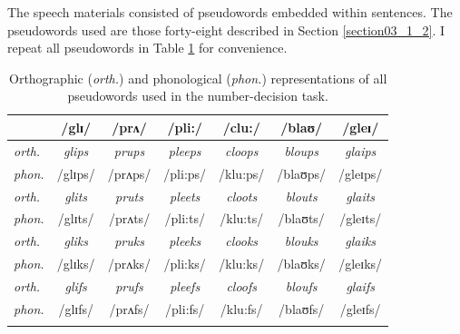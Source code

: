 The speech materials consisted of pseudowords embedded within sentences. The pseudowords used are those forty-eight described in Section \ref{section03_1_2}. I repeat all pseudowords in Table \ref{tab:8.1} for convenience.

\begin{table}\fontsize{10}{11}
\caption{Orthographic (\textit{orth.}) and phonological (\textit{phon.}) representations of all pseudowords used in the number-decision task.}
\label{tab:8.1}
\centering
\begin{tabular}{lcccccc} 
\lsptoprule
~              & /glɪ/          & /prʌ/          & /pli:/          & /clu:/          & /blaʊ/          & /gleɪ/           \\ 
\midrule
\textit{orth.} & \textit{glips} & \textit{prups} & \textit{pleeps} & \textit{cloops} & \textit{bloups} & \textit{glaips}  \\
\textit{phon.} & /glɪps/        & /prʌps/        & /pli:ps/        & /klu:ps/        & /blaʊps/        & /gleɪps/         \\ 
\midrule
\textit{orth.} & \textit{glits} & \textit{pruts} & \textit{pleets} & \textit{cloots} & \textit{blouts} & \textit{glaits}  \\
\textit{phon.} & /glɪts/        & /prʌts/        & /pli:ts/        & /klu:ts/        & /blaʊts/        & /gleɪts/         \\ 
\midrule
\textit{orth.} & \textit{gliks} & \textit{pruks} & \textit{pleeks} & \textit{clooks} & \textit{blouks} & \textit{glaiks}  \\
\textit{phon.} & /glɪks/        & /prʌks/        & /pli:ks/        & /klu:ks/        & /blaʊks/        & /gleɪks/         \\ 
\midrule
\textit{orth.} & \textit{glifs} & \textit{prufs} & \textit{pleefs} & \textit{cloofs} & \textit{bloufs} & \textit{glaifs}  \\
\textit{phon.} & /glɪfs/        & /prʌfs/        & /pli:fs/        & /klu:fs/        & /blaʊfs/        & /gleɪfs/         \\
\lspbottomrule
\end{tabular}
\end{table}

